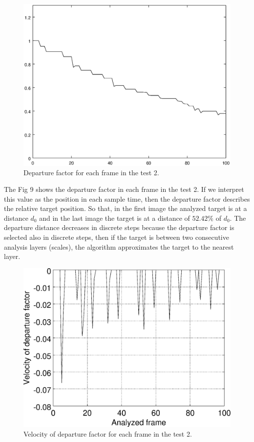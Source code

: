 \begin{figure}[!hbt]
\includegraphics[width=\columnwidth]{images/graph2.eps}
\caption{Departure factor for each frame in the test 2.}
\label{fig:res_graph2}
\end{figure}
The Fig 9 shows the departure factor in each frame
in the test 2. If we interpret this value as the position in each sample time, 
then the departure factor describes the relative target position.
So that, in the first image the analyzed target is at a distance $d_0$ 
and in the last image the target is at a distance of $52.42\%$ of $d_0$.
The departure distance decreases in discrete steps because the departure
factor is selected also in discrete steps, then if the target is
between two consecutive analysis layers (scales), the algorithm
approximates the target to the nearest layer. 
\begin{figure}[!hbt]
\includegraphics[width=\columnwidth]{images/graph2v.eps}
\caption{Velocity of departure factor for each frame in the test 2.}
\label{fig:res_graph2v}
\end{figure}
